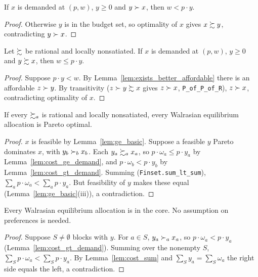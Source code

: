 \begin{lemma}
\label{lem:cost_gt_demand}
\leanok
{}
If $x$ is demanded at $(p, w)$, $y \ge 0$ and $y \succ x$, then $w < p \cdot y$.
\end{lemma}
\begin{proof}
\leanok
Otherwise $y$ is in the budget set, so optimality of $x$ gives $x \succsim y$, contradicting $y \succ x$.
\end{proof}

\begin{lemma}
\label{lem:cost_ge_demand}
\leanok
{}
Let $\succsim$ be rational and locally nonsatiated. If $x$ is demanded at $(p, w)$, $y \ge 0$ and $y \succsim x$, then
$w \le p \cdot y$.
\end{lemma}
\begin{proof}
\leanok
Suppose $p \cdot y < w$. By Lemma~\ref{lem:exists_better_affordable} there is an affordable $z \succ y$. By
transitivity ($z \succ y \succsim x$ gives $z \succ x$, \texttt{P\_of\_P\_of\_R}), $z \succ x$, contradicting optimality
of $x$.
\end{proof}

\begin{theorem}
\label{thm:first_welfare}
\leanok
{}
If every $\succsim_a$ is rational and locally nonsatiated, every Walrasian equilibrium allocation is Pareto optimal.
\end{theorem}
\begin{proof}
\leanok
$x$ is feasible by Lemma~\ref{lem:ge_basic}. Suppose a feasible $y$ Pareto dominates $x$, with $y_b \succ_b x_b$.
Each $y_a \succsim_a x_a$, so $p \cdot \omega_a \le p \cdot y_a$ by Lemma~\ref{lem:cost_ge_demand}, and
$p \cdot \omega_b < p \cdot y_b$ by Lemma~\ref{lem:cost_gt_demand}. Summing (\texttt{Finset.sum\_lt\_sum}),
$\sum_a p \cdot \omega_a < \sum_a p \cdot y_a$. But feasibility of $y$ makes these equal
(Lemma~\ref{lem:ge_basic}(iii)), a contradiction.
\end{proof}

\begin{theorem}
\label{thm:eq_in_core}
\leanok
{}
Every Walrasian equilibrium allocation is in the core. No assumption on preferences is needed.
\end{theorem}
\begin{proof}
\leanok
Suppose $S \neq \emptyset$ blocks with $y$. For $a \in S$, $y_a \succ_a x_a$, so $p \cdot \omega_a < p \cdot y_a$
(Lemma~\ref{lem:cost_gt_demand}). Summing over the nonempty $S$, $\sum_S p \cdot \omega_a < \sum_S p \cdot y_a$. By
Lemma~\ref{lem:cost_sum} and $\sum_S y_a = \sum_S \omega_a$ the right side equals the left, a contradiction.
\end{proof}

